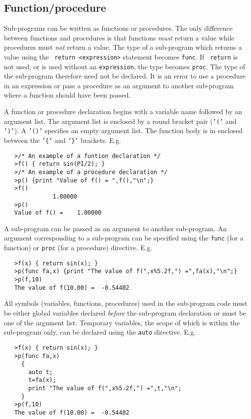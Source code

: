 \documentclass[11pt]{article}
\begin{document}
\subsection{Function/procedure}
\label{APPEN:SYNTAX_FUNC}

Sub-programs can be written as functions or procedures.  The only
difference between functions and procedures is that functions {\it
must} return a value while procedures must {\it not} return a value.
The type of a sub-program which returns a value using the {\tt
return}~{\tt <expression>} statement becomes {\tt func}.  If {\tt
return} is not used, or is used without an {\tt expression}, the type
becomes {\tt proc}.  The type of the sub-program therefore need not be
declared.  It is an error to use a procedure in an expression or pass
a procedure as an argument to another sub-program where a function
should have been passed.

A function or procedure declaration begins with a variable name
followed by an argument list.  The argument list is enclosed by a
round bracket pair ({\tt '('} and {\tt ')'}).  A {\tt '()'} specifies
an empty argument list.  The function body is in enclosed between the
{\tt '\{'} and {\tt '\}'} brackets.  E.g.
\begin{verbatim}
   >/* An example of a funtion declaration */
   >f() { return sin(PI/2); }
   >/* An example of a procedure declaration */ 
   >p() {print "Value of f() = ",f(),"\n";}
   >f()
              1.00000
   >p() 
   Value of f() =    1.00000
\end{verbatim}
A sub-program can be passed as an argument to another sub-program.  An
argument corresponding to a sub-program can be specified using the
{\tt func} (for a function) or {\tt proc} (for a procedure) directive.
E.g.
\begin{verbatim}
   >f(x) { return sin(x); }
   >p(func fa,x) {print "The value of f(",x%5.2f,") =",fa(x),"\n";}
   >p(f,10)
   The value of f(10.00) =  -0.54402
\end{verbatim}
All symbols (variables, functions, procedures) used in the sub-program
code must be either global variables declared {\it before} the
sub-program declaration or must be one of the argument list.
Temporary variables, the scope of which is within the sub-program
only, can be declared using the {\tt auto} directive.  E.g.
\begin{verbatim}
   >f(x) { return sin(x); }
   >p(func fa,x)
     {
       auto t;
       t=fa(x);
       print "The value of f(",x%5.2f,") =",t,"\n";
     }
   >p(f,10)
   The value of f(10.00) =  -0.54402
\end{verbatim}
\end{document}
